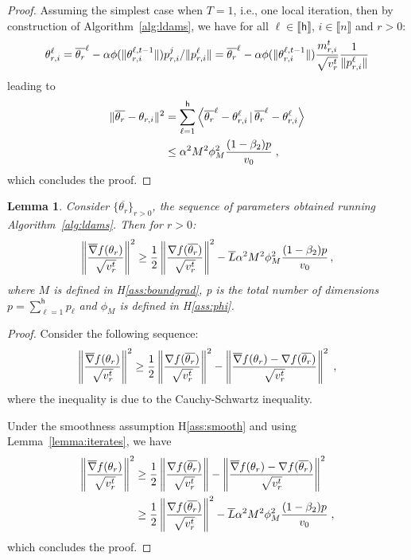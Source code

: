 \documentclass[11pt]{article}
\newtheorem*{Lemma*}{Lemma}
\newcommand{\eqsp}{\;}
\newcommand{\beq}{\begin{equation}}
\newcommand{\eeq}{\end{equation}}
\newcommand{\pscal}[2]{\left\langle#1\,|\,#2 \right\rangle}
\newcommand{\inter}{\llbracket n \rrbracket}
\def\tot{\mathsf{h}}
\begin{document}
\begin{proof}
Assuming the simplest case when $T=1$, i.e., one local iteration, then by construction of Algorithm~\ref{alg:ldams}, we have for all $\ell \in \llbracket \tot \rrbracket$, $i \in \inter$ and $r >0$:
\beq\notag
 \theta^{\ell}_{r,i} =  \overline{\theta_r}^{\ell}  - \alpha \phi(\|\theta_{r,i}^{\ell,t-1}\|)p_{r,i}^{j} / \|p_{r,i}^{\ell}\|=  \overline{\theta_r}^{\ell}  - \alpha \phi(\|\theta_{r,i}^{\ell,t-1}\|)  
 \frac{m^{t}_{r,i}}{\sqrt{v^{t}_{r}}} \frac{1}{\|p_{r,i}^{\ell}\|}
\eeq
leading to 
\beq\notag
\begin{split}
\|\overline{\theta_r}   -  \theta_{r,i}\|^2 & = \sum_{\ell=1}^\tot \pscal{\overline{\theta_r}^{\ell}   -  \theta^{\ell}_{r,i}}{\overline{\theta_r}^{\ell}   -  \theta^{\ell}_{r,i}} \\
& \leq \alpha^2 M^2 \phi_M^2 \frac{(1-\beta_2)p}{v_0} \eqsp,
\end{split}
\eeq
which concludes the proof.
\end{proof}



\begin{Lemma*}
Consider $\{\overline{\theta_r}\}_{r>0}$, the sequence of parameters obtained running Algorithm~\ref{alg:ldams}. Then for $r > 0$:
\beq\notag
\left\| \frac{\overline{\nabla}f(\theta_r)}{\sqrt{ v_r^t}} \right\|^2 \geq \frac{1}{2} \left\| \frac{\nabla f(\overline{\theta_r})}{\sqrt{ v_r^t}} \right\|^2 - \overline{L} \alpha^2 M^2 \phi_M^2 \frac{(1-\beta_2)p}{v_0}\, ,
\eeq
where $M$ is defined in H\ref{ass:boundgrad}, p is the total number of dimensions $p = \sum_{\ell = 1}^\tot p_\ell$ and $\phi_M$ is defined in H\ref{ass:phi}.
\end{Lemma*}

\begin{proof}
Consider the following sequence:
\beq\notag
\begin{split}
\left\| \frac{\overline{\nabla}f(\theta_r)}{\sqrt{ v_r^t}} \right\|^2 \geq \frac{1}{2} \left\| \frac{\nabla f(\overline{\theta_r})}{\sqrt{ v_r^t}} \right\|^2 - \left\| \frac{\overline{\nabla}f(\theta_r)- \nabla f(\overline{\theta_r})}{\sqrt{ v_r^t}} \right\|^2 \eqsp,
\end{split}
\eeq
where the inequality is due to the Cauchy-Schwartz inequality.

Under the smoothness assumption H\ref{ass:smooth} and using Lemma~\ref{lemma:iterates}, we have
\beq\notag
\begin{split}
\left\| \frac{\overline{\nabla}f(\theta_r)}{\sqrt{ v_r^t}} \right\|^2 & \geq \frac{1}{2} \left\| \frac{\nabla f(\overline{\theta_r})}{\sqrt{ v_r^t}} \right\| - \left\| \frac{\overline{\nabla}f(\theta_r)- \nabla f(\overline{\theta_r})}{\sqrt{ v_r^t}} \right\|^2\\
& \geq \frac{1}{2} \left\| \frac{\nabla f(\overline{\theta_r})}{\sqrt{ v_r^t}} \right\|^2 - \overline{L} \alpha^2 M^2 \phi_M^2 \frac{(1-\beta_2)p}{v_0} \eqsp,
\end{split}
\eeq
which concludes the proof.
\end{proof}
\end{document}
